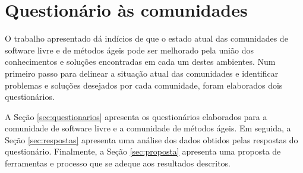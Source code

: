 \chapter{Questionário às comunidades}
\label{cap:pesquisas}

O trabalho apresentado dá indícios de que o estado atual das
comunidades de software livre e de métodos ágeis pode ser melhorado
pela união dos conhecimentos e soluções encontradas em cada um destes
ambientes. Num primeiro passo para delinear a situação atual das
comunidades e identificar problemas e soluções desejados por cada
comunidade, foram elaborados dois questionários.

A Seção \ref{sec:questionarios} apresenta os questionários elaborados
para a comunidade de software livre e a comunidade de métodos
ágeis. Em seguida, a Seção \ref{sec:respostas} apresenta uma análise
dos dados obtidos pelas respostas do questionário. Finalmente, a Seção
\ref{sec:proposta} apresenta uma proposta de ferramentas e processo
que se adeque aos resultados descritos.

